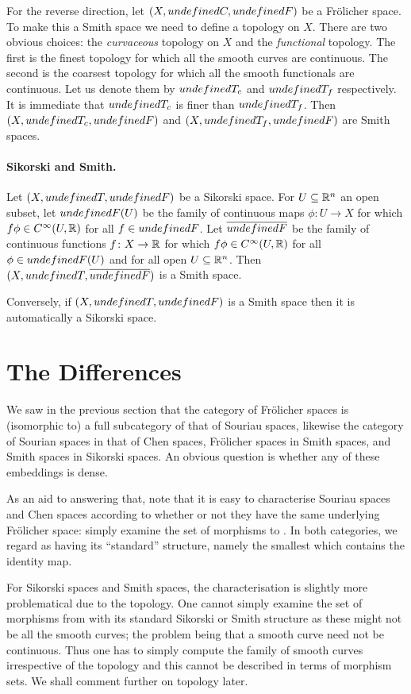 \documentclass[%
a4paper,%
arxiv,%
defaults
]{myclass}
\begin{document}
For the reverse direction, let \((X, \m{C}, \m{F})\) be a Fr\"olicher space.
To make this a Smith space we need to define a topology on \(X\).
There are two obvious choices: the \emph{curvaceous} topology on \(X\) and the \emph{functional} topology.
The first is the finest topology for which all the smooth curves are continuous.
The second is the coarsest topology for which all the smooth functionals are continuous.
Let us denote them by \(\m{T}_c\) and \(\m{T}_f\) respectively.
It is immediate that \(\m{T}_c\) is finer than \(\m{T}_f\).
Then \((X, \m{T}_c, \m{F})\) and \((X, \m{T}_f, \m{F})\) are Smith spaces.

\paragraph{Sikorski and Smith.}

Let \((X, \m{T}, \m{F})\) be a Sikorski space.
For \(U \subseteq \mathbb{R}^n\) an open subset, let \(\m{F}(U)\) be the family of continuous maps \(\phi \colon U \to X\) for which \(f \phi \in C^\infty(U, \mathbb{R})\) for all \(f \in \m{F}\).
Let \(\overline{\m{F}}\) be the family of continuous functions \(f \colon X \to \mathbb{R}\) for which \(f \phi \in C^\infty(U, \mathbb{R})\) for all \(\phi \in \m{F}(U)\) and for all open \(U \subseteq \mathbb{R}^n\).
Then \((X, \m{T}, \overline{\m{F}})\) is a Smith space.

Conversely, if \((X, \m{T}, \m{F})\) is a Smith space then it is automatically a Sikorski space.

\section{The Differences}
\label{sec:diff}

We saw in the previous section that the category of Fr\"olicher spaces is (isomorphic to) a full subcategory of that of Souriau spaces, likewise the category of Sourian spaces in that of Chen spaces, Fr\"olicher spaces in Smith spaces, and Smith spaces in Sikorski spaces.
An obvious question is whether any of these embeddings is dense.

As an aid to answering that, note that it is easy to characterise Souriau spaces and Chen spaces according to whether or not they have the same underlying Fr\"olicher space: simply examine the set of morphisms to \R.
In both categories, we regard \R as having its ``standard'' structure, namely the smallest which contains the identity map.

For Sikorski spaces and Smith spaces, the characterisation is slightly more problematical due to the topology.
One cannot simply examine the set of morphisms from \R with its standard Sikorski or Smith structure as these might not be all the smooth curves; the problem being that a smooth curve need not be continuous.
Thus one has to simply compute the family of smooth curves irrespective of the topology and this cannot be described in terms of morphism sets.
We shall comment further on topology later.
\end{document}
